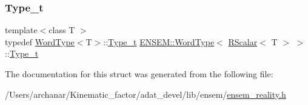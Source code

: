 \mbox{\label{structENSEM_1_1WordType_3_01RScalar_3_01T_01_4_01_4_a348d1b21435dcb68c291fefa3ae5c20c}} 
\subsubsection{\texorpdfstring{Type\_t}{Type\_t}\hspace{0.1cm}{\footnotesize\ttfamily [2/2]}}
{\footnotesize\ttfamily template$<$class T $>$ \\
typedef \mbox{\hyperlink{structENSEM_1_1WordType}{Word\+Type}}$<$T$>$\+::\mbox{\hyperlink{structENSEM_1_1WordType_3_01RScalar_3_01T_01_4_01_4_a348d1b21435dcb68c291fefa3ae5c20c}{Type\+\_\+t}} \mbox{\hyperlink{structENSEM_1_1WordType}{E\+N\+S\+E\+M\+::\+Word\+Type}}$<$ \mbox{\hyperlink{classENSEM_1_1RScalar}{R\+Scalar}}$<$ T $>$ $>$\+::\mbox{\hyperlink{structENSEM_1_1WordType_3_01RScalar_3_01T_01_4_01_4_a348d1b21435dcb68c291fefa3ae5c20c}{Type\+\_\+t}}}



The documentation for this struct was generated from the following file\+:\begin{DoxyCompactItemize}
\item 
/\+Users/archanar/\+Kinematic\+\_\+factor/adat\+\_\+devel/lib/ensem/\mbox{\hyperlink{lib_2ensem_2ensem__reality_8h}{ensem\+\_\+reality.\+h}}\end{DoxyCompactItemize}
